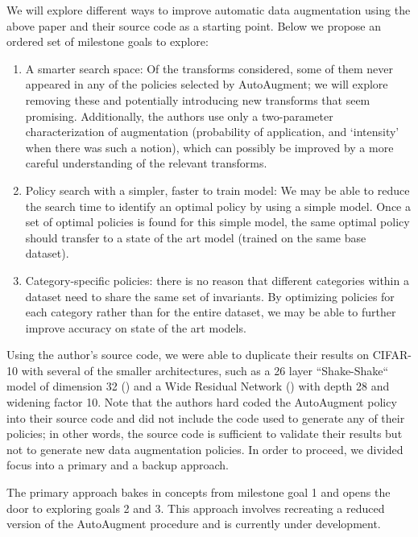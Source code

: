 \documentclass[10pt,twocolumn,letterpaper]{article}
\begin{document}
We will explore different ways to improve automatic data augmentation using the above paper and their source code as a starting point. Below we propose an ordered set of milestone goals to explore:
	
\begin{enumerate}

\item %
A smarter search space: Of the transforms considered, some of them never appeared in any of the policies selected by AutoAugment; we will explore removing these and potentially introducing new transforms that seem promising. Additionally, the authors use only a two-parameter characterization of augmentation (probability of application, and ‘intensity’ when there was such a notion), which can possibly be improved by a more careful understanding of the relevant transforms.

\item %
		Policy search with a simpler, faster to train model: We may be able to reduce the search time to identify an optimal policy by using a simple model. Once a set of optimal policies is found for this simple model, the same optimal policy should transfer to a state of the art model (trained on the same base dataset).

\item %
Category-specific policies: there is no reason that different categories within a dataset need to share the same set of invariants. By optimizing policies for each category rather than for the entire dataset, we may be able to further improve accuracy on state of the art models.

\end{enumerate}

Using the author's source code, we were able to duplicate their results on CIFAR-10 with several of the smaller architectures, such as a 26 layer ``Shake-Shake`` model of dimension 32 (\cite{Gastaldi2017}) and a Wide Residual Network (\cite{Zagoruyko2016}) with depth 28 and widening factor 10. Note that the authors hard coded the AutoAugment policy into their source code and did not include the code used to generate any of their policies; in other words, the source code is sufficient to validate their results but not to generate new data augmentation policies. In order to proceed, we divided focus into a primary and a backup approach. 

	The primary approach bakes in concepts from milestone goal 1 and opens the door to exploring goals 2 and 3. This approach involves recreating a reduced version of the AutoAugment procedure and is currently under development.
\end{document}
